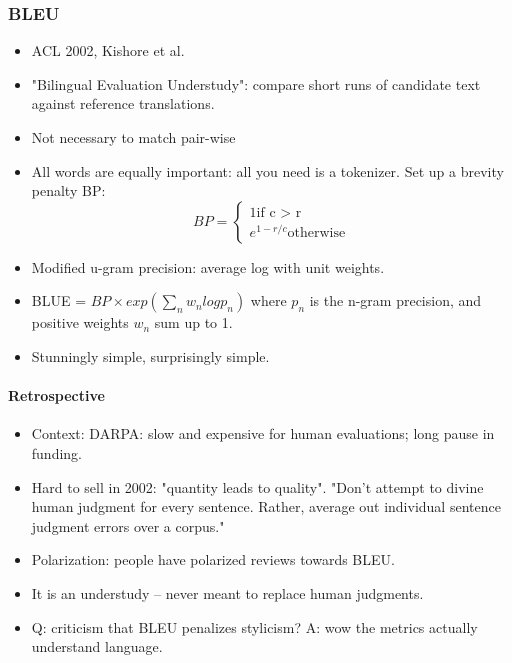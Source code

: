 \subsubsection{BLEU}
\begin{itemize}
	\item ACL 2002, Kishore et al.
	\item "Bilingual Evaluation Understudy": compare short runs of candidate text against reference translations.
	\item Not necessary to match pair-wise
	\item All words are equally important: all you need is a tokenizer. Set up a brevity penalty BP:
	\[BP=\left\{ \begin{matrix} 1 \text{if c > r}  \\ e^{1-r/c} \text{otherwise} \end{matrix}  \right. \]
	\item Modified u-gram precision: average log with unit weights.
	\item BLUE = $BP \times exp(\sum_n w_n log p_n)$  where $p_n$ is the n-gram precision, and positive weights $w_n$ sum up to 1.
	\item Stunningly simple, surprisingly simple.
\end{itemize}

\paragraph{Retrospective}
\begin{itemize}
	\item Context: DARPA: slow and expensive for human evaluations; long pause in funding.
	\item Hard to sell in 2002: "quantity leads to quality". "Don't attempt to divine human judgment for every sentence. Rather, average out individual sentence judgment errors over a corpus."
	\item Polarization: people have polarized reviews towards BLEU.
	\item It is an understudy -- never meant to replace human judgments.
	\item Q: criticism that BLEU penalizes stylicism? A: wow the metrics actually understand language.
\end{itemize}

